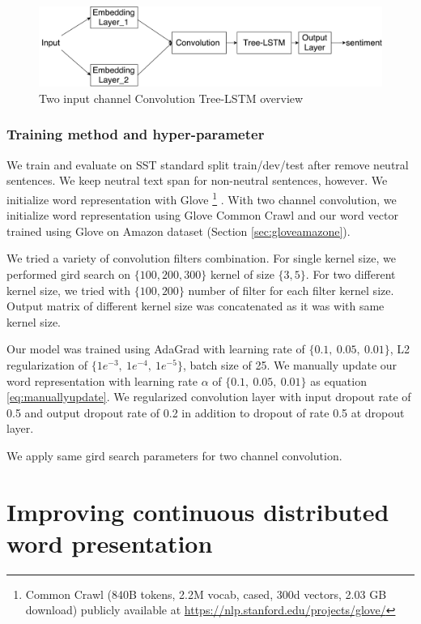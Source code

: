 \begin{figure}[H]
	\centering
	\includegraphics[width=0.8\linewidth]{figure/multichannelcnnlstm}
	\caption[Convolution Tree-LSTM overview]{Two input channel Convolution Tree-LSTM overview}
	\label{fig:multichannelcnnlstm}
\end{figure}

\subsubsection{Training method and hyper-parameter}
We train and evaluate on SST standard split train/dev/test after remove neutral sentences. We keep neutral text span for non-neutral sentences, however. We initialize word representation with Glove \footnote{\label{glovecommoncrawl}Common Crawl (840B tokens, 2.2M vocab, cased, 300d vectors, 2.03 GB download) publicly available at \url{https://nlp.stanford.edu/projects/glove/}} \cite{glove}. With two channel convolution, we initialize word representation using Glove Common Crawl and our word vector trained using Glove on Amazon dataset (Section \ref{sec:gloveamazone}). 

We tried a variety of convolution filters combination. For single kernel size, we performed gird search on $\{100, 200, 300\}$ kernel of size $\{3, 5\}$. For two different kernel size, we tried with $\{100, 200\}$ number of filter for each filter kernel size. Output matrix of different kernel size was concatenated as it was with same kernel size. 

Our model was trained using AdaGrad \cite{duchi2011adaptive} with learning rate of $\{0.1,~ 0.05,~ 0.01\}$, L2 regularization of $\{1e^{-3},~ 1e^{-4}, ~ 1e^{-5} \}$, batch size of 25. We manually update our word representation with learning rate $\alpha$ of $\{0.1,~0.05, ~0.01\}$ as equation \ref{eq:manuallyupdate}. We regularized convolution layer with input dropout rate of 0.5 and output dropout rate of 0.2 in addition to dropout of rate 0.5 at dropout layer. 

We apply same gird search parameters for two channel convolution. 


\section{Improving continuous distributed word presentation} \label{sec:improveembedding}

